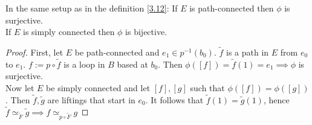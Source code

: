 \begin{theorem}\label{3.13}
    In the same setup as in the definition \ref{3.12}:
    If $E$ is path-connected then $\phi$ is surjective.\\
    If $E$ is simply connected then $\phi$ is bijective.
\end{theorem}
\begin{proof}
    First, let $E$ be path-connected and $e_1\in p^{-1}(b_0)$. $\tilde f$ is a path in $E$ from $e_0$ to $e_1$. $f:=p\circ \tilde f$ is a loop in $B$ based at $b_0$. Then $\phi([f])=\tilde f(1)=e_1\implies \phi$ is surjective.\\
    Now let $E$ be simply connected and let $[f],[g]$ such that $\phi([f])=\phi([g])$. Then $\tilde f,\tilde g$ are liftings that start in $e_0$. It follows that $\tilde f(1)=\tilde g(1)$, hence $\tilde f\simeq_{\tilde F}\tilde g\implies f\simeq_{p\circ\tilde F}g$ 
\end{proof}


